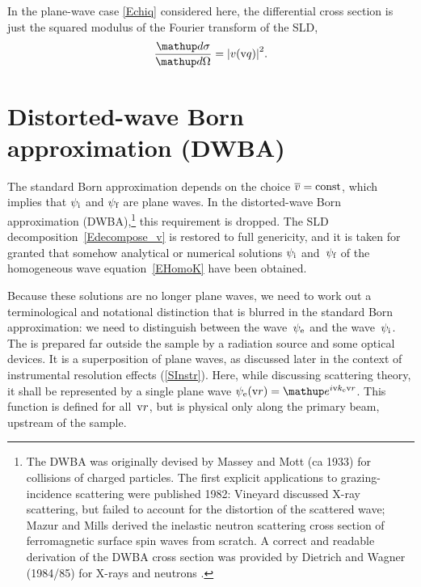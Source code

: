 In the plane-wave case \cref{Echiq} considered here,
the differential cross section is just the squared modulus
of the Fourier transform of the SLD,
%
\begin{equation}\label{Ecross1}
  \xElas
  = {\left| v(\q) \right|}^2.
\end{equation}

\section{Distorted-wave Born approximation (DWBA)}\label{SDWBA}

%
%

The standard Born approximation depends on the choice $\mv=\text{const}$,
which implies that $\psi_\si$ and $\psi_\sf$ are plane waves.
In the distorted-wave Born approximation (DWBA),\footnote{
The DWBA was originally devised by Massey and Mott (ca 1933)
for collisions of charged particles.
The first explicit applications to grazing-incidence scattering
were published 1982:
Vineyard \cite{Vin82} discussed X-ray scattering,
but failed to account for the distortion of the scattered wave;
Mazur and Mills \cite{MaMi82} derived the inelastic neutron scattering cross section
of ferromagnetic surface spin waves from scratch.
A correct and readable derivation of the DWBA cross section
was provided by Dietrich and Wagner (1984/85) for X-rays \cite{DiWa84}
and neutrons \cite{DiWa85}.}
this requirement is dropped.
The SLD decomposition~\cref{Edecompose_v}
is restored to full genericity,
and it is taken for granted
that somehow analytical or numerical solutions $\psi_\si$ and~$\psi_\sf$
of the homogeneous wave equation~\cref{EHomoK}
have been obtained.

Because these solutions are no longer plane waves,
we need to work out a terminological and notational distinction
that is blurred in the standard Born approximation:
we need to distinguish
 between the  wave~$\psi_\se$
%
and the  wave~$\psi_\si$.
The 
%
%
is prepared far
outside the sample by a radiation source and some optical devices.
%
It is a superposition of plane waves,
as discussed later in the context of instrumental resolution effects
(\cref{SInstr}).
Here, while discussing scattering theory,
it shall be represented by a single plane wave
$\psi_\se(\r)=\e^{i\k_\se\r}$.
This function is defined for all~$\r$,
but is physical only along the primary beam, upstream of the sample.

